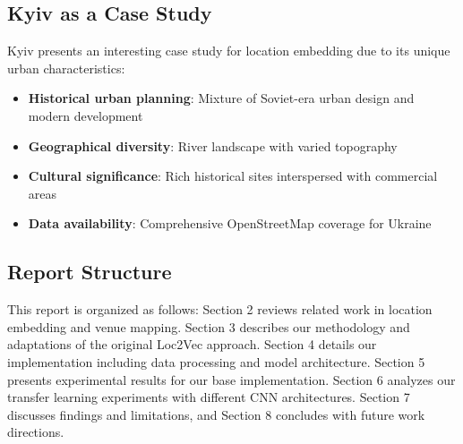 \subsection{Kyiv as a Case Study}

Kyiv presents an interesting case study for location embedding due to its unique urban characteristics:
\begin{itemize}
    \item \textbf{Historical urban planning}: Mixture of Soviet-era urban design and modern development
    \item \textbf{Geographical diversity}: River landscape with varied topography
    \item \textbf{Cultural significance}: Rich historical sites interspersed with commercial areas
    \item \textbf{Data availability}: Comprehensive OpenStreetMap coverage for Ukraine
\end{itemize}

\subsection{Report Structure}

This report is organized as follows: Section 2 reviews related work in location embedding and venue mapping. Section 3 describes our methodology and adaptations of the original Loc2Vec approach. Section 4 details our implementation including data processing and model architecture. Section 5 presents experimental results for our base implementation. Section 6 analyzes our transfer learning experiments with different CNN architectures. Section 7 discusses findings and limitations, and Section 8 concludes with future work directions.
